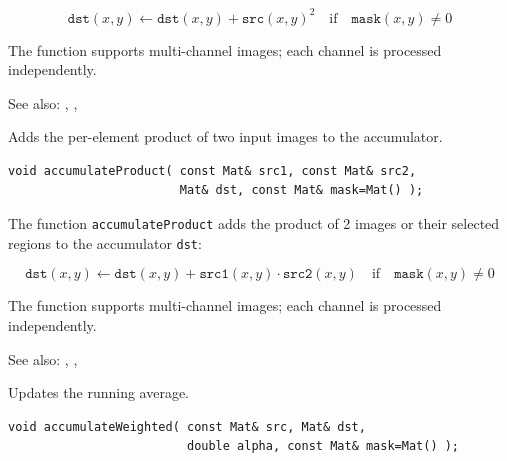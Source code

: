 \[ \texttt{dst}(x,y) \leftarrow \texttt{dst}(x,y) + \texttt{src}(x,y)^2 \quad \text{if} \quad \texttt{mask}(x,y) \ne 0 \]

The function supports multi-channel images; each channel is processed independently.

See also: , , 

\label{accumulateProduct}
Adds the per-element product of two input images to the accumulator.

\begin{lstlisting}
void accumulateProduct( const Mat& src1, const Mat& src2,
                        Mat& dst, const Mat& mask=Mat() );
\end{lstlisting}
\begin{description}
\end{description}

The function \texttt{accumulateProduct} adds the product of 2 images or their selected regions to the accumulator \texttt{dst}:

\[ \texttt{dst}(x,y) \leftarrow \texttt{dst}(x,y) + \texttt{src1}(x,y) \cdot \texttt{src2}(x,y) \quad \text{if} \quad \texttt{mask}(x,y) \ne 0 \]

The function supports multi-channel images; each channel is processed independently.

See also: , , 

\label{accumulateWeighted}
Updates the running average.

\begin{lstlisting}
void accumulateWeighted( const Mat& src, Mat& dst,
                         double alpha, const Mat& mask=Mat() );
\end{lstlisting}
\begin{description}
\end{description}


